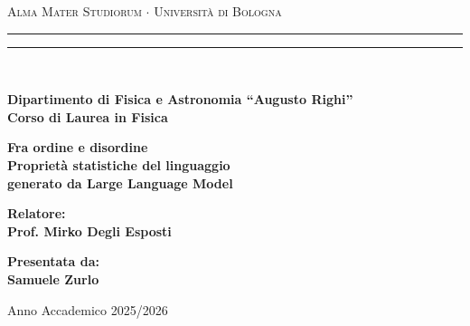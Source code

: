 \begin{titlepage}

\begin{center}
{{\Large{\textsc{Alma Mater Studiorum $\cdot$ Universit\`a di Bologna}}}}
\rule[0.1cm]{15.8cm}{0.1mm}
\rule[0.5cm]{15.8cm}{0.6mm}
\\\vspace{3mm}

{\small{\bf Dipartimento di Fisica e Astronomia ``Augusto Righi''\\
Corso di Laurea in Fisica}}

\end{center}

\vspace{23mm}

\begin{center}
%
%
{\LARGE{\bf Fra ordine e disordine}}\\[5mm]
{\Large{\bf Propriet\`a statistiche del linguaggio\\
generato da Large Language Model}}
\end{center}

\vspace{50mm} \par \noindent

\begin{minipage}[t]{0.47\textwidth}
%
%
{\large{\bf Relatore: \vspace{2mm}\\
Prof. Mirko Degli Esposti}}
\end{minipage}
%
\hfill
%
\begin{minipage}[t]{0.47\textwidth}\raggedleft
{\large{\bf Presentata da:
\vspace{2mm}\\
%
%
Samuele Zurlo}}
\end{minipage}

\vspace{40mm}

\begin{center}
%
%
Anno Accademico 2025/2026
\end{center}

\end{titlepage}

\restoregeometry
